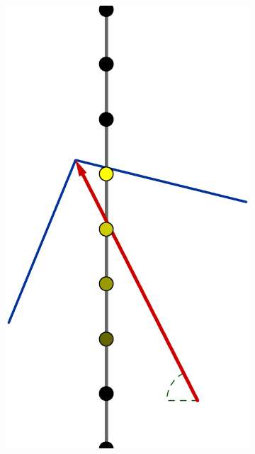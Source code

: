 \documentclass[../Main.tex]{subfiles}
\begin{document}
\begin{figure}[!tbph]
\begin{subfigure}[b]{0.24\textwidth}
    \includegraphics[width=\textwidth]{SANTA_2}
  \end{subfigure} \hspace*{\fill} \\
  \hspace*{\fill}
  \begin{subfigure}[b]{0.32\textwidth}
    \centering

\end{subfigure}
\end{figure}
\end{document}
